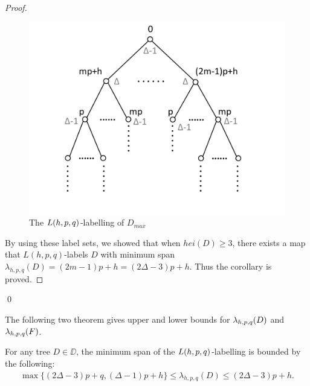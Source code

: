 \begin{proof}
\begin{figure}
 \centering
      \vspace{-20pt}
    \includegraphics[scale=0.4]{../figures/fig3-6-b.pdf}
        \vspace{-0pt}
\caption{The $L(h,p,q)$-labelling of $D_{max}$}
\label{ex D 11}
\end{figure}


By using these label sets, we showed that when $hei(D) \ge 3$, there exists a map that $L(h,p,q)$-labels $D$ with minimum span $\lambda_{h,p,q}(D) = (2m-1)p+h=(2\Delta-3)p+h$. Thus the corollary is proved.  
\end{proof}
\qed

The following two theorem gives upper and lower bounds for $\lambda_{h,p,q}(D)$ and $\lambda_{h,p,q}(F)$. 

\begin{theorem}
\label{thm:h11forD}
For any tree $D \in \DD$, the minimum span of the $L(h,p,q)$-labelling is bounded by the following:
\begin{align*}
\max\{(2\Delta - 3)p+q, (\Delta-1)p+h\} \le \lambda_{h,p,q}(D) \le (2\Delta-3)p + h. 
\end{align*}
\end{theorem}

